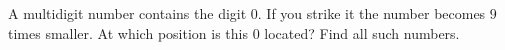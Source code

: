A multidigit number contains the digit $0$. If you strike it the number becomes $9$ times smaller. At which position is this $0$ located? Find all such numbers.
